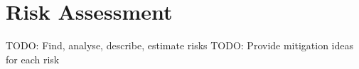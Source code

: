 \chapter{Risk Assessment}
\label{ch:risk_assessment}
TODO: Find, analyse, describe, estimate risks
TODO: Provide mitigation ideas for each risk